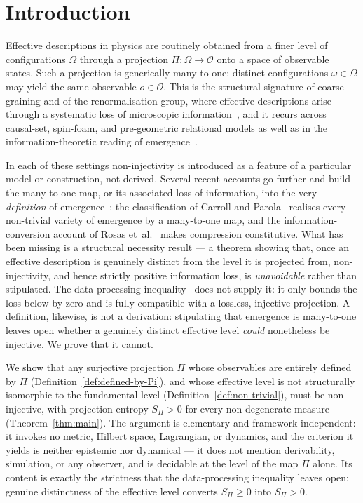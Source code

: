 \documentclass[12pt,a4paper]{article}
\begin{document}
    \clearpage
    \tableofcontents

    \clearpage

  \section{Introduction}
  \label{sec:intro}

  Effective descriptions in physics are routinely obtained from a finer level of configurations $\Omega$
  through a projection $\Pi : \Omega \to \mathcal{O}$ onto a space of observable states.
  Such a projection is generically many-to-one: distinct configurations $\omega \in \Omega$ may yield the same
  observable $o \in \mathcal{O}$.
  This is the structural signature of coarse-graining and of the renormalisation group, where effective
  descriptions arise through a systematic loss of microscopic
  information~\citep{Wilson1975,Jaynes1957,GellMannHartle1993}, and it recurs across causal-set, spin-foam, and
  pre-geometric relational models as well as in the information-theoretic reading of
  emergence~\citep{Anderson1972,Butterfield2011,Ellis2012}.

  In each of these settings non-injectivity is introduced as a feature of a particular model or construction,
  not derived.
  Several recent accounts go further and build the many-to-one map, or its associated loss of information, into
  the very \emph{definition} of emergence~\citep{Rizi2025,Rosas2022,CarrollParola2024}: the classification of
  Carroll and Parola~\citep{CarrollParola2024} realises every non-trivial variety of emergence by a
  many-to-one map, and the information-conversion account of Rosas et~al.~\citep{Rosas2022} makes compression
  constitutive.
  What has been missing is a structural necessity result --- a theorem showing that, once an effective
  description is genuinely distinct from the level it is projected from, non-injectivity, and hence strictly
  positive information loss, is \emph{unavoidable} rather than stipulated.
  The data-processing inequality~\citep{CoverThomas2006} does not supply it: it only bounds the loss below by
  zero and is fully compatible with a lossless, injective projection.
  A definition, likewise, is not a derivation: stipulating that emergence is many-to-one leaves open whether a
  genuinely distinct effective level \emph{could} nonetheless be injective.
  We prove that it cannot.

  We show that any surjective projection $\Pi$ whose observables are entirely defined by $\Pi$
  (Definition~\ref{def:defined-by-Pi}), and whose effective level is not structurally isomorphic to the
  fundamental level (Definition~\ref{def:non-trivial}), must be non-injective, with projection entropy
  $S_\Pi > 0$ for every non-degenerate measure (Theorem~\ref{thm:main}).
  The argument is elementary and framework-independent: it invokes no metric, Hilbert space, Lagrangian, or
  dynamics, and the criterion it yields is neither epistemic nor dynamical --- it does not mention derivability,
  simulation, or any observer, and is decidable at the level of the map $\Pi$ alone.
  Its content is exactly the strictness that the data-processing inequality leaves open: genuine distinctness of
  the effective level converts $S_\Pi \geq 0$ into $S_\Pi > 0$.
\end{document}
